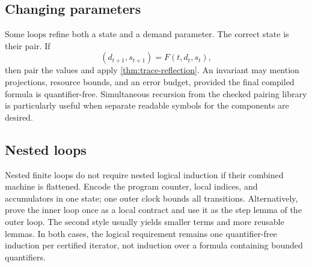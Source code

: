 \subsection{Changing parameters}

Some loops refine both a state and a demand parameter.  The correct state is their pair.  If
\[
  (d_{t+1},s_{t+1})=F(t,d_t,s_t),
\]
then pair the values and apply \cref{thm:trace-reflection}.  An invariant may mention projections, resource bounds, and an error budget, provided the final compiled formula is quantifier-free.  Simultaneous recursion from the checked pairing library is particularly useful when separate readable symbols for the components are desired.

\subsection{Nested loops}

Nested finite loops do not require nested logical induction if their combined machine is flattened.  Encode the program counter, local indices, and accumulators in one state; one outer clock bounds all transitions.  Alternatively, prove the inner loop once as a local contract and use it as the step lemma of the outer loop.  The second style usually yields smaller terms and more reusable lemmas.  In both cases, the logical requirement remains one quantifier-free induction per certified iterator, not induction over a formula containing bounded quantifiers.
